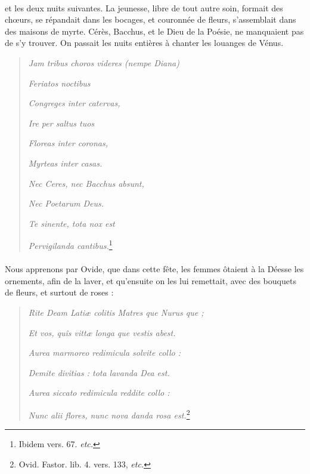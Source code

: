 \documentclass[a4paper, 11pt, oneside, polutonikogreek, french]{article}
\begin{document}
\paragraph{}
et les deux nuits suivantes. La jeunesse, libre de tout autre soin, formait des chœurs, se répandait dans les bocages, et couronnée de fleurs, s'assemblait dans des maisons de myrte. Cérès, Bacchus, et le Dieu de la Poésie, ne manquaient pas de s'y trouver. On passait les nuits entières à chanter les louanges de Vénus.
\begin{quotation}
\emph{Jam tribus choros videres (nempe Diana)}

\hspace*{5mm}\emph{Feriatos noctibus}

\emph{Congreges inter catervas,}

\hspace*{5mm}\emph{Ire per saltus tuos}

\emph{Floreas inter coronas,}

\hspace*{5mm}\emph{Myrteas inter casas.}

\emph{Nec Ceres, nec Bacchus absunt,}

\hspace*{5mm}\emph{Nec Poetarum Deus.}

\emph{Te sinente, tota nox est}

\hspace*{5mm}\emph{Pervigilanda cantibus.}\footnote{Ibidem vers. 67. \emph{etc.}}
\end{quotation}
\paragraph{}
Nous apprenons par Ovide, que dans cette fête, les femmes ôtaient à la Déesse les ornements, afin de la laver, et qu'ensuite on les lui remettait, avec des bouquets de fleurs, et surtout de roses :
\begin{quotation}
\emph{Rite Deam Latiæ colitis Matres que Nurus que ;}

\hspace*{5mm}\emph{Et vos, quîs vittæ longa que vestis abest.}

\emph{Aurea marmoreo redimicula solvite collo :}

\hspace*{5mm}\emph{Demite divitias : tota lavanda Dea est.}

\emph{Aurea siccato redimicula reddite collo :}

\hspace*{5mm}\emph{Nunc alii flores, nunc nova danda rosa est.}\footnote{Ovid. Fastor. lib. 4. vers. 133, \emph{etc.}}
\end{quotation}
\end{document}
